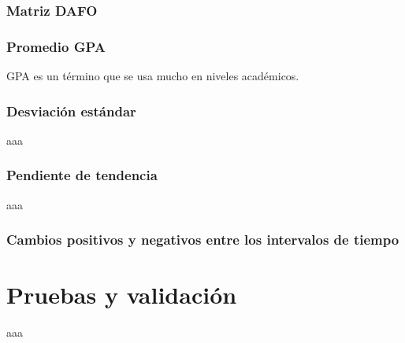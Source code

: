 \subsubsection{Matriz DAFO}
\subsubsection{Promedio GPA}
GPA es un término que se usa mucho en niveles académicos.

\subsubsection{Desviación estándar}
aaa
\subsubsection{Pendiente de tendencia}
aaa
\subsubsection{Cambios positivos y negativos entre los intervalos de tiempo}

\section{Pruebas y validación}
aaa